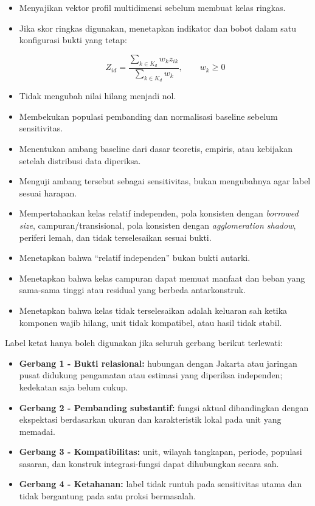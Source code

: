 \documentclass[
  indonesian,
  11pt,
]{article}
\providecommand{\tightlist}{%
  \setlength{\itemsep}{0pt}\setlength{\parskip}{0pt}}
\renewcommand{\tightlist}{%
  \setlength{\itemsep}{0.22em}%
  \setlength{\parskip}{0pt}%
}
\begin{document}
\begin{itemize}
\item[$\square$]
  Menyajikan vektor profil multidimensi sebelum membuat kelas ringkas.
\item[$\square$]
  Jika skor ringkas digunakan, menetapkan indikator dan bobot dalam satu
  konfigurasi bukti yang tetap:

  \[
  Z_{id}=\frac{\sum_{k \in K_d} w_k z_{ik}}{\sum_{k \in K_d} w_k}, \qquad w_k \geq 0
  \]
\item[$\square$]
  Tidak mengubah nilai hilang menjadi nol.
\item[$\square$]
  Membekukan populasi pembanding dan normalisasi baseline sebelum
  sensitivitas.
\item[$\square$]
  Menentukan ambang baseline dari dasar teoretis, empiris, atau
  kebijakan setelah distribusi data diperiksa.
\item[$\square$]
  Menguji ambang tersebut sebagai sensitivitas, bukan mengubahnya agar
  label sesuai harapan.
\item[$\square$]
  Mempertahankan kelas relatif independen, pola konsisten dengan
  \emph{borrowed size}, campuran/transisional, pola konsisten dengan
  \emph{agglomeration shadow}, periferi lemah, dan tidak terselesaikan
  sesuai bukti.
\item[$\square$]
  Menetapkan bahwa ``relatif independen'' bukan bukti autarki.
\item[$\square$]
  Menetapkan bahwa kelas campuran dapat memuat manfaat dan beban yang
  sama-sama tinggi atau residual yang berbeda antarkonstruk.
\item[$\square$]
  Menetapkan bahwa kelas tidak terselesaikan adalah keluaran sah ketika
  komponen wajib hilang, unit tidak kompatibel, atau hasil tidak stabil.
\end{itemize}

Label ketat hanya boleh digunakan jika seluruh gerbang berikut
terlewati:

\begin{itemize}
\tightlist
\item[$\square$]
  \textbf{Gerbang 1 - Bukti relasional:} hubungan dengan Jakarta atau
  jaringan pusat didukung pengamatan atau estimasi yang diperiksa
  independen; kedekatan saja belum cukup.
\item[$\square$]
  \textbf{Gerbang 2 - Pembanding substantif:} fungsi aktual dibandingkan
  dengan ekspektasi berdasarkan ukuran dan karakteristik lokal pada unit
  yang memadai.
\item[$\square$]
  \textbf{Gerbang 3 - Kompatibilitas:} unit, wilayah tangkapan, periode,
  populasi sasaran, dan konstruk integrasi-fungsi dapat dihubungkan
  secara sah.
\item[$\square$]
  \textbf{Gerbang 4 - Ketahanan:} label tidak runtuh pada sensitivitas
  utama dan tidak bergantung pada satu proksi bermasalah.
\end{itemize}
\end{document}
